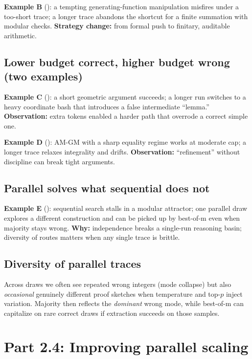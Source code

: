 \documentclass[11pt]{article}
\begin{document}
\textbf{Example B} (): a tempting generating-function manipulation misfires under a too-short trace; a longer trace abandons the shortcut for a finite summation with modular checks. \textbf{Strategy change:} from formal push to finitary, auditable arithmetic.

\subsection{Lower budget correct, higher budget wrong (two examples)}

\textbf{Example C} (): a short geometric argument succeeds; a longer run switches to a heavy coordinate bash that introduces a false intermediate ``lemma.'' \textbf{Observation:} extra tokens enabled a harder path that overrode a correct simple one.

\textbf{Example D} (): AM-GM with a sharp equality regime works at moderate cap; a longer trace relaxes integrality and drifts. \textbf{Observation:} ``refinement'' without discipline can break tight arguments.

\subsection{Parallel solves what sequential does not}

\textbf{Example E} (): sequential search stalls in a modular attractor; one parallel draw explores a different construction and can be picked up by best-of-m even when majority stays wrong. \textbf{Why:} independence breaks a single-run reasoning basin; diversity of routes matters when any single trace is brittle.

\subsection{Diversity of parallel traces}

Across draws we often see repeated wrong integers (mode collapse) but also \emph{occasional} genuinely different proof sketches when temperature and top-$p$ inject variation. Majority then reflects the \emph{dominant} wrong mode, while best-of-m can capitalize on rare correct draws if extraction succeeds on those samples.

\newpage
\section{Part 2.4: Improving parallel scaling}
\end{document}

